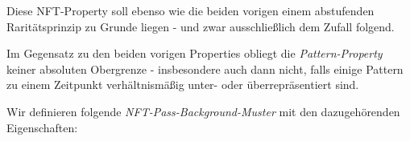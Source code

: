 
\begin{sloppypar}
Diese NFT-Property soll ebenso wie die beiden vorigen einem abstufenden Raritätsprinzip zu Grunde liegen - und zwar ausschließlich dem Zufall folgend.
\end{sloppypar}

Im Gegensatz zu den beiden vorigen Properties obliegt die \textit{Pattern-Property} keiner absoluten Obergrenze - insbesondere auch dann nicht, falls einige Pattern zu einem Zeitpunkt verhältnismäßig unter- oder überrepräsentiert sind.

\vspace{0.3cm}

\begin{NFT-Prop}
\label{pattern}

Wir definieren folgende \textit{NFT-Pass-Background-Muster} mit den dazugehörenden Eigenschaften:


\end{NFT-Prop}
